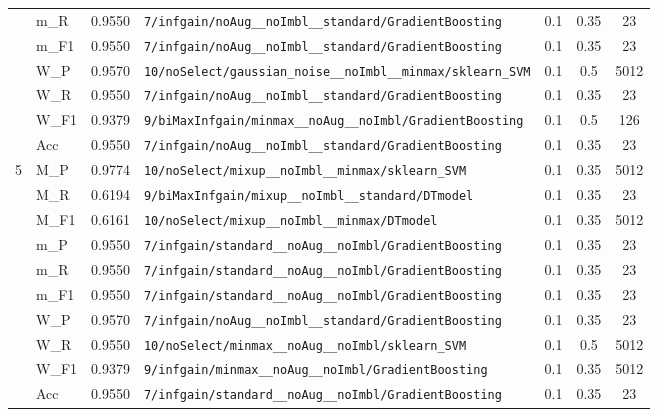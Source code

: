\begin{table}[htbp]
\begin{tabular}{|c|l|c|>{\ttfamily\footnotesize}p{7.2cm}|c|c|c|}
 & m\_R & 0.9550 & \texttt{7/infgain/noAug\_\_noImbl\_\_standard/GradientBoosting} & 0.1 & 0.35  & 23 \\ 
 & m\_F1 & 0.9550 & \texttt{7/infgain/noAug\_\_noImbl\_\_standard/GradientBoosting} & 0.1 & 0.35  & 23 \\ 
 & W\_P & 0.9570 & \texttt{10/noSelect/gaussian\_noise\_\_noImbl\_\_minmax/sklearn\_SVM} & 0.1 & 0.5  & 5012 \\ 
 & W\_R & 0.9550 & \texttt{7/infgain/noAug\_\_noImbl\_\_standard/GradientBoosting} & 0.1 & 0.35  & 23 \\ 
 & W\_F1 & 0.9379 & \texttt{9/biMaxInfgain/minmax\_\_noAug\_\_noImbl/GradientBoosting} & 0.1 & 0.5  & 126 \\ 
 & Acc & 0.9550 & \texttt{7/infgain/noAug\_\_noImbl\_\_standard/GradientBoosting} & 0.1 & 0.35  & 23 \\ 
\hline
\multirow{10}{*}{5} & M\_P & 0.9774 & \texttt{10/noSelect/mixup\_\_noImbl\_\_minmax/sklearn\_SVM} & 0.1 & 0.35  & 5012 \\ 
 & M\_R & 0.6194 & \texttt{9/biMaxInfgain/mixup\_\_noImbl\_\_standard/DTmodel} & 0.1 & 0.35  & 23 \\ 
 & M\_F1 & 0.6161 & \texttt{10/noSelect/mixup\_\_noImbl\_\_minmax/DTmodel} & 0.1 & 0.35  & 5012 \\ 
 & m\_P & 0.9550 & \texttt{7/infgain/standard\_\_noAug\_\_noImbl/GradientBoosting} & 0.1 & 0.35  & 23 \\ 
 & m\_R & 0.9550 & \texttt{7/infgain/standard\_\_noAug\_\_noImbl/GradientBoosting} & 0.1 & 0.35  & 23 \\ 
 & m\_F1 & 0.9550 & \texttt{7/infgain/standard\_\_noAug\_\_noImbl/GradientBoosting} & 0.1 & 0.35  & 23 \\ 
 & W\_P & 0.9570 & \texttt{7/infgain/noAug\_\_noImbl\_\_standard/GradientBoosting} & 0.1 & 0.35  & 23 \\ 
 & W\_R & 0.9550 & \texttt{10/noSelect/minmax\_\_noAug\_\_noImbl/sklearn\_SVM} & 0.1 & 0.5  & 5012 \\ 
 & W\_F1 & 0.9379 & \texttt{9/infgain/minmax\_\_noAug\_\_noImbl/GradientBoosting} & 0.1 & 0.35  & 5012 \\ 
 & Acc & 0.9550 & \texttt{7/infgain/standard\_\_noAug\_\_noImbl/GradientBoosting} & 0.1 & 0.35  & 23 \\ 
\hline
\end{tabular}
\end{table}